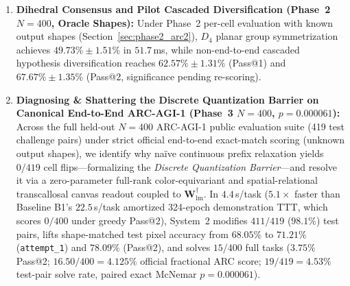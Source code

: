 \documentclass[11pt,a4paper]{article}
\theoremstyle{plain}
\theoremstyle{definition}
\theoremstyle{remark}
\begin{document}
\begin{enumerate}
    \item \textbf{Dihedral Consensus and Pilot Cascaded Diversification (Phase~2 $N=400$, Oracle Shapes):} Under Phase~2 per-cell evaluation with known output shapes (Section~\ref{sec:phase2_arc2}), $D_4$ planar group symmetrization achieves $49.73\% \pm 1.51\%$ in $51.7$\,ms, while non-end-to-end cascaded hypothesis diversification reaches $62.57\% \pm 1.31\%$ (Pass@1) and $67.67\% \pm 1.35\%$ (Pass@2, significance pending re-scoring).
    \item \textbf{Diagnosing \& Shattering the Discrete Quantization Barrier on Canonical End-to-End ARC-AGI-1 (Phase~3 $N = 400$, $p = 0.000061$):} Across the full held-out $N=400$ ARC-AGI-1 public evaluation suite (419 test challenge pairs) under strict official end-to-end exact-match scoring (unknown output shapes), we identify why na\"ive continuous prefix relaxation yields $0 / 419$ cell flips---formalizing the \emph{Discrete Quantization Barrier}---and resolve it via a zero-parameter full-rank color-equivariant and spatial-relational transcallosal canvas readout coupled to $\mathbf{W}_{\mathrm{lm}}^\dagger$. In $4.4$\,s/task ($5.1\times$ faster than Baseline B1's $22.5$\,s/task amortized 324-epoch demonstration TTT, which scores $0 / 400$ under greedy Pass@2), System~2 modifies $411 / 419$ ($98.1\%$) test pairs, lifts shape-matched test pixel accuracy from $68.05\%$ to $71.21\%$ (\texttt{attempt\_1}) and $78.09\%$ (Pass@2), and solves $15 / 400$ full tasks ($3.75\%$ Pass@2; $16.50 / 400 = 4.125\%$ official fractional ARC score; $19 / 419 = 4.53\%$ test-pair solve rate, paired exact McNemar $p = 0.000061$).
\end{enumerate}
\end{document}
